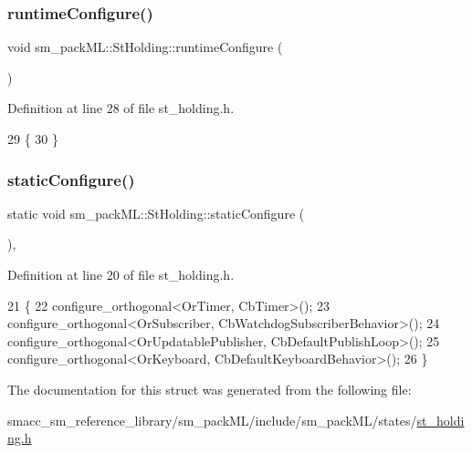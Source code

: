 \subsubsection{\texorpdfstring{runtime\+Configure()}{runtimeConfigure()}}
{\footnotesize\ttfamily void sm\+\_\+pack\+M\+L\+::\+St\+Holding\+::runtime\+Configure (\begin{DoxyParamCaption}{ }\end{DoxyParamCaption})\hspace{0.3cm}{\ttfamily [inline]}}



Definition at line 28 of file st\+\_\+holding.\+h.


\begin{DoxyCode}
29     \{
30     \}
\end{DoxyCode}
\mbox{\label{structsm__packML_1_1StHolding_a3603a3a25ae5928eb1a39a480426a1b0}} 
\subsubsection{\texorpdfstring{static\+Configure()}{staticConfigure()}}
{\footnotesize\ttfamily static void sm\+\_\+pack\+M\+L\+::\+St\+Holding\+::static\+Configure (\begin{DoxyParamCaption}{ }\end{DoxyParamCaption})\hspace{0.3cm}{\ttfamily [inline]}, {\ttfamily [static]}}



Definition at line 20 of file st\+\_\+holding.\+h.


\begin{DoxyCode}
21     \{
22         configure\_orthogonal<OrTimer, CbTimer>();   
23         configure\_orthogonal<OrSubscriber, CbWatchdogSubscriberBehavior>();
24         configure\_orthogonal<OrUpdatablePublisher, CbDefaultPublishLoop>();
25         configure\_orthogonal<OrKeyboard, CbDefaultKeyboardBehavior>();
26     \}
\end{DoxyCode}


The documentation for this struct was generated from the following file\+:\begin{DoxyCompactItemize}
\item 
smacc\+\_\+sm\+\_\+reference\+\_\+library/sm\+\_\+pack\+M\+L/include/sm\+\_\+pack\+M\+L/states/\hyperlink{st__holding_8h}{st\+\_\+holding.\+h}\end{DoxyCompactItemize}
